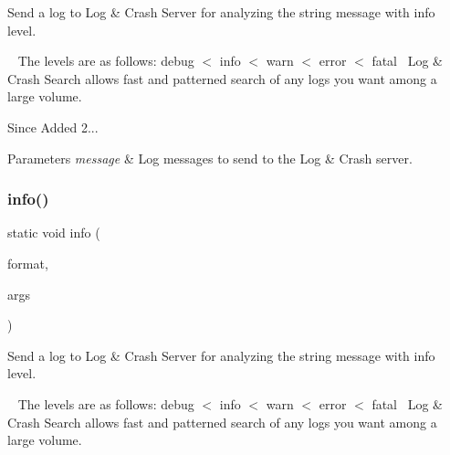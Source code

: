 Send a log to Log \& Crash Server for analyzing the string message with info level. 

~\newline
 The levels are as follows\+: debug $<$ info $<$ warn $<$ error $<$ fatal~\newline
 Log \& Crash Search allows fast and patterned search of any logs you want among a large volume.

\begin{DoxySince}{Since}
Added 2... 
\end{DoxySince}

\begin{DoxyParams}{Parameters}
{\em message} & Log messages to send to the Log \& Crash server. \\
\hline
\end{DoxyParams}
\mbox{\label{classcom_1_1toast_1_1android_1_1gamebase_1_1_gamebase_1_1_logger_a1b5b7e9f340d0bcd5384e74ff190826b}} 
\subsubsection{\texorpdfstring{info()}{info()}\hspace{0.1cm}{\footnotesize\ttfamily [2/3]}}
{\footnotesize\ttfamily static void info (\begin{DoxyParamCaption}\item[{@Non\+Null final String}]{format,  }\item[{@Non\+Null final Object...}]{args }\end{DoxyParamCaption})\hspace{0.3cm}{\ttfamily [static]}}



Send a log to Log \& Crash Server for analyzing the string message with info level. 

~\newline
 The levels are as follows\+: debug $<$ info $<$ warn $<$ error $<$ fatal~\newline
 Log \& Crash Search allows fast and patterned search of any logs you want among a large volume.

